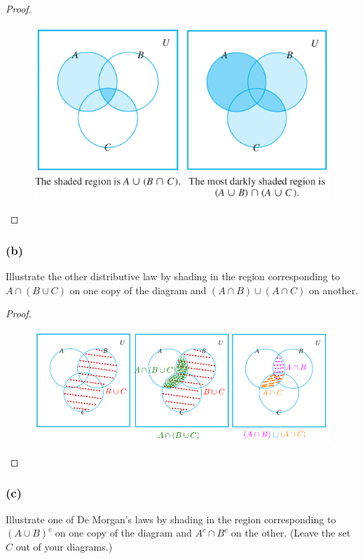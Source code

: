 \documentclass[14pt]{extarticle}
\begin{document}
\begin{proof}
\begin{figure}[ht!]
\centering
\includegraphics[scale=0.5]{../images/6.2.26.a.png}
\end{figure}
\end{proof}

\subsubsection{(b)}
Illustrate the other distributive law by shading in the region corresponding to \(A \cap (B \cup C)\) on one copy 
of the diagram and \((A \cap B) \cup (A \cap C)\) on another.

\begin{proof}
\begin{figure}[ht!]
\centering
\includegraphics[scale=0.5]{../images/6.2.26.b.png}
\end{figure}
\end{proof}

\subsubsection{(c)}
Illustrate one of De Morgan’s laws by shading in the region corresponding to \((A \cup B)^c\) on one copy of the 
diagram and \(A^c \cap B^c\) on the other. (Leave the set $C$ out of your diagrams.)
\end{document}
